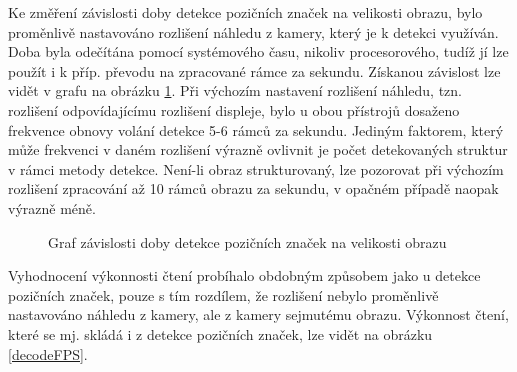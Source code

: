 Ke změření závislosti doby detekce pozičních značek na velikosti obrazu, bylo
proměnlivě nastavováno rozlišení náhledu z kamery, který je k detekci využíván.
Doba byla odečítána pomocí systémového času, nikoliv procesorového, tudíž jí
lze použít i k příp. převodu na zpracované rámce za sekundu. Získanou závislost
lze vidět v grafu na obrázku \ref{detectionFPS}. Při výchozím nastavení
rozlišení náhledu, tzn.
rozlišení odpovídajícímu rozlišení displeje, bylo u obou přístrojů dosaženo
frekvence obnovy volání detekce 5-6 rámců za sekundu. Jediným faktorem, který
může frekvenci v daném rozlišení výrazně ovlivnit je počet detekovaných struktur
v rámci metody detekce. Není-li obraz strukturovaný, lze pozorovat při výchozím
rozlišení zpracování až 10 rámců obrazu za sekundu, v opačném případě naopak
výrazně méně.

 \begin{figure}[H]
  \begin{center}
    \caption{Graf závislosti doby detekce pozičních značek na velikosti obrazu}
    \label{detectionFPS}
  \end{center}
\end{figure}

Vyhodnocení výkonnosti čtení probíhalo obdobným způsobem jako u detekce
pozičních značek, pouze s tím rozdílem, že rozlišení nebylo proměnlivě
nastavováno náhledu z kamery, ale z kamery sejmutému obrazu. Výkonnost čtení,
které se mj. skládá i z detekce pozičních značek, lze vidět na obrázku
\ref{decodeFPS}.

